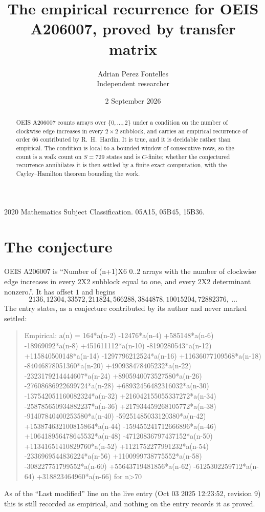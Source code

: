 \documentclass[11pt,a4paper]{article}
\title{The empirical recurrence for OEIS A206007, proved by transfer matrix}
\author{Adrian Perez Fontelles\\ \small Independent researcher}
\date{2 September 2026}
\theoremstyle{plain}
\theoremstyle{definition}
\begin{document}
\maketitle

\begin{abstract}
OEIS A206007 counts arrays over $\{0,\dots,2\}$ under a condition on the number of clockwise edge increases
in every $2\times2$ subblock, and carries an empirical recurrence of order $66$ contributed by
R.~H.~Hardin. It is true, and it is decidable rather than empirical. The condition is local to
a bounded window of consecutive rows, so the count is a walk count on $S=729$ states and is
$C$-finite; whether the conjectured recurrence annihilates it is then settled by a finite exact
computation, with the Cayley--Hamilton theorem bounding the work.
\end{abstract}

\noindent\small 2020 Mathematics Subject Classification. 05A15, 05B45, 15B36.\normalsize

\section{The conjecture}

OEIS A206007 is ``Number of (n+1)X6 0..2 arrays with the number of clockwise edge increases in every 2X2 subblock equal to one, and every 2X2 determinant nonzero.''. It has offset $1$ and begins
\[
2136, 12304, 33572, 211824, 566288, 3844878, 10015204, 72882376,\ \dots
\]
The entry states, as a conjecture contributed by its author and never marked settled:
\begin{quote}
Empirical: a(n) = 164*a(n-2) -12476*a(n-4) +585148*a(n-6) -18969092*a(n-8) +451611112*a(n-10) -8190280543*a(n-12) +115840500148*a(n-14) -1297796212524*a(n-16) +11636077109568*a(n-18) -84046878051360*a(n-20) +490938478405232*a(n-22) -2323179214444607*a(n-24) +8905940073527580*a(n-26) -27608686922699724*a(n-28) +68932456482316032*a(n-30) -137542051160082324*a(n-32) +216042155055337272*a(n-34) -258785650934882237*a(n-36) +217934459268105772*a(n-38) -91407840400253580*a(n-40) -59251485033120380*a(n-42) +153874632100815864*a(n-44) -159455241712666896*a(n-46) +106418956478645532*a(n-48) -47120836797437152*a(n-50) +11341651410829760*a(n-52) +1121752277991232*a(n-54) -2336969544836224*a(n-56) +1100999738775552*a(n-58) -308227751799552*a(n-60) +55643719481856*a(n-62) -6125302259712*a(n-64) +318823464960*a(n-66) for n>70
\end{quote}
As of the ``Last modified'' line on the live entry (Oct 03 2025 12:23:52, revision 9) this is still
recorded as empirical, and nothing on the entry records it as proved.
\end{document}
